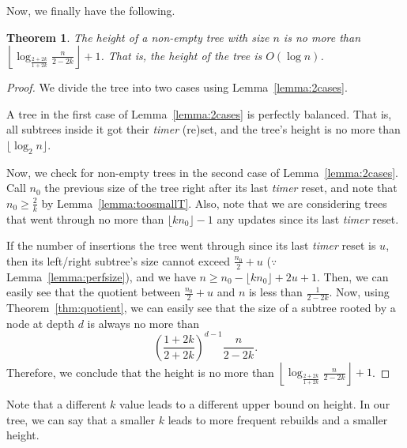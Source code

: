 \documentclass{article}
\newtheorem{theorem}{Theorem}
\begin{document}
Now, we finally have the following.
\begin{theorem}
The height of a non-empty tree with size $n$ is no more than $\left\lfloor \log_{\frac{2+2k}{1+2k}}{\frac{n}{2-2k}} \right\rfloor+1$. That is, the height of the tree is $O(\log n)$.
\end{theorem}
\begin{proof}
We divide the tree into two cases using Lemma~\ref{lemma:2cases}.

A tree in the first case of Lemma~\ref{lemma:2cases} is perfectly balanced. That is, all subtrees inside it got their \emph{timer} (re)set, and the tree's height is no more than $\lfloor \log_{2}{n}\rfloor$.

Now, we check for non-empty trees in the second case of Lemma~\ref{lemma:2cases}. Call $n_0$ the previous size of the tree right after its last \emph{timer} reset, and note that $n_0\geq \frac{2}{k}$ by Lemma~\ref{lemma:toosmallT}. Also, note that we are considering trees that went through no more than $\lfloor kn_0 \rfloor-1$ any updates since its last \emph{timer} reset.

If the number of insertions the tree went through since its last \emph{timer} reset is $u$, then its left/right subtree's size cannot exceed $\frac{n_0}{2}+u$ ($\because$ Lemma~\ref{lemma:perfsize}), and we have $n \geq n_0-\lfloor kn_0 \rfloor+2u+1$. Then, we can easily see that the quotient between $\frac{n_0}{2}+u$ and $n$ is less than $\frac{1}{2-2k}$. Now, using Theorem~\ref{thm:quotient}, we can easily see that the size of a subtree rooted by a node at depth $d$ is always no more than
\begin{equation*}
    \left(\frac{1+2k}{2+2k}\right)^{d-1}\frac{n}{2-2k}.
\end{equation*}
Therefore, we conclude  that the height is no more than $\left\lfloor \log_{\frac{2+2k}{1+2k}}{\frac{n}{2-2k}} \right\rfloor+1$.
\end{proof}

Note that a different $k$ value leads to a different upper bound on height. In our tree, we can say that a smaller $k$ leads to more frequent rebuilds and a smaller height.
\end{document}
